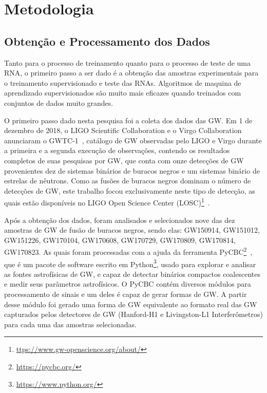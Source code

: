 \chapter{Metodologia}

\section{Obtenção e Processamento dos Dados}

Tanto para o processo de treinamento quanto para o processo de teste de uma RNA, o primeiro passo a ser dado é a obtenção das amostras experimentais para o treinamento supervisionado e teste das RNAs. Algoritmos de maquina de aprendizado supervisionados são muito mais eficazes quando treinados com conjuntos de dados muito grandes.

O primeiro passo dado nesta pesquisa foi a coleta dos dados das GW. Em 1 de dezembro de 2018, o LIGO Scientific Collaboration e o Virgo Collaboration anunciaram o GWTC-1~\cite{Abbott_2019}, catálogo de GW observadas pelo LIGO e Virgo durante a primeira e a segunda execução de observações, contendo os resultados completos de suas pesquisas por GW, que conta com onze detecções de GW provenientes dez de sistemas binários de buracos negros e um sistemas binário de estrelas de nêutrons. Como as fusões de buracos negros dominam o número de detecções de GW, este trabalho focou exclusivamente neste tipo de detecção, as quais estão disponíveis no LIGO Open Science Center (LOSC)\footnote{\href{https://www.gw-openscience.org/about/}{ttps://www.gw-openscience.org/about/}}~\cite{vallisneri2015ligo}. 

Após a obtenção dos dados, foram analisados e selecionados nove das dez amostras de GW de fusão de buracos negros, sendo elas: GW150914, GW151012, GW151226, GW170104, GW170608, GW170729, GW170809, GW170814, GW170823. As quais foram processadas com a ajuda da ferramenta PyCBC\footnote{\href{https://pycbc.org/}{https://pycbc.org/}}~\cite{alex_nitz_2019_2801307}, que é um pacote de software escrito em Python\footnote{\href{https://www.python.org/}{https://www.python.org/}}, usado para explorar e analisar as fontes astrofísicas de GW, e capaz de detectar binários compactos coalescentes e medir seus parâmetros astrofísicos. O PyCBC contém diversos módulos para processamento de sinais e um deles é capaz de gerar formas de GW. A partir desse módulo foi gerado uma forma de GW equivalente ao formato real das GW capturados pelos detectores de GW (Hanford-H1 e Livingston-L1 Interferômetros) para cada uma das amostras selecionadas.

